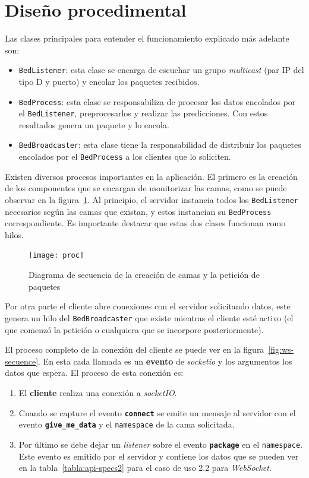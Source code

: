 \section{Diseño procedimental}\label{sec:disproc}
Las clases principales para entender el funcionamiento explicado más adelante son:
\begin{itemize}
	\item \texttt{BedListener}: esta clase se encarga de escuchar un grupo \textit{multicast} (par IP del tipo D y puerto) y encolar los paquetes recibidos.
	\item \texttt{BedProcess}: esta clase se responsabiliza de procesar los datos encolados por el \texttt{BedListener}, preprocesarlos y realizar las predicciones. Con estos resultados genera un paquete y lo encola.
	\item \texttt{BedBroadcaster}: esta clase tiene la responsabilidad de distribuir los paquetes encolados por el \texttt{BedProcess} a los clientes que lo soliciten.
\end{itemize}

Existen diversos procesos importantes en la aplicación. El primero es la creación de los componentes que se encargan de monitorizar las camas, como se puede observar en la figura~\ref{fig:proc_sec}. Al principio, el servidor instancia todos los \texttt{BedListener} necesarios según las camas que existan, y estos instancian su \texttt{BedProcess} correspondiente. Es importante destacar que estas dos clases funcionan como hilos. 

\begin{figure}
	\centering
	\texttt{[image: proc]}
	\caption{Diagrama de secuencia de la creación de camas y la petición de paquetes}
	\label{fig:proc_sec}
\end{figure}

Por otra parte el cliente abre conexiones con el servidor solicitando datos, este genera un hilo del \texttt{BedBroadcaster} que existe mientras el cliente esté activo (el que comenzó la petición o cualquiera que se incorpore posteriormente). 

El proceso completo de la conexión del cliente se puede ver en la figura~\ref{fig:ws-secuence}. En esta cada llamada es un \textbf{evento} de \textit{socketio} y los argumentos los datos que espera. El proceso de esta conexión es:
\begin{enumerate}
	\item El \textbf{cliente} realiza una conexión a \textit{socketIO}.
	\item Cuando se capture el evento \texttt{\textbf{connect}} se emite un mensaje al servidor con el evento \texttt{\textbf{give\_me\_data}} y el \texttt{namespace} de la cama solicitada.
	\item Por último se debe dejar un \textit{listener} sobre el evento \texttt{\textbf{package}} en el \texttt{namespace}. Este evento es emitido por el servidor y contiene los datos que se pueden ver en la tabla~\ref{tabla:api-specs2} para el caso de uso 2.2 para \textit{WebSocket}.
\end{enumerate}

